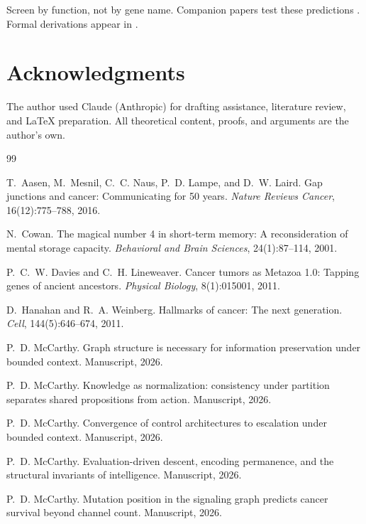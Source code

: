 \documentclass[11pt]{article}
\begin{document}
Screen by function, not by gene name. Companion papers test these
predictions \cite{McCarthy2026f, McCarthy2026h}. Formal derivations
appear in \cite{McCarthy2026a, McCarthy2026b, McCarthy2026c,
McCarthy2026d}.

\section*{Acknowledgments}

The author used Claude (Anthropic) for drafting assistance, literature review, and \LaTeX{} preparation. All theoretical content, proofs, and arguments are the author's own.


\begin{thebibliography}{99}

T.~Aasen, M.~Mesnil, C.~C. Naus, P.~D. Lampe, and D.~W. Laird.
\newblock Gap junctions and cancer: Communicating for 50 years.
\newblock \emph{Nature Reviews Cancer}, 16(12):775--788, 2016.

N.~Cowan.
\newblock The magical number 4 in short-term memory: A reconsideration of
  mental storage capacity.
\newblock \emph{Behavioral and Brain Sciences}, 24(1):87--114, 2001.

P.~C.~W. Davies and C.~H. Lineweaver.
\newblock Cancer tumors as {Metazoa} 1.0: Tapping genes of ancient ancestors.
\newblock \emph{Physical Biology}, 8(1):015001, 2011.

D.~Hanahan and R.~A. Weinberg.
\newblock Hallmarks of cancer: The next generation.
\newblock \emph{Cell}, 144(5):646--674, 2011.

P.~D. McCarthy.
\newblock Graph structure is necessary for information preservation under
  bounded context.
\newblock Manuscript, 2026.

P.~D. McCarthy.
\newblock Knowledge as normalization: consistency under partition separates
  shared propositions from action.
\newblock Manuscript, 2026.

P.~D. McCarthy.
\newblock Convergence of control architectures to escalation under bounded context.
\newblock Manuscript, 2026.

P.~D. McCarthy.
\newblock Evaluation-driven descent, encoding permanence, and the structural
  invariants of intelligence.
\newblock Manuscript, 2026.

P.~D. McCarthy.
\newblock Mutation position in the signaling graph predicts cancer survival
  beyond channel count.
\newblock Manuscript, 2026.


\end{thebibliography}
\end{document}
